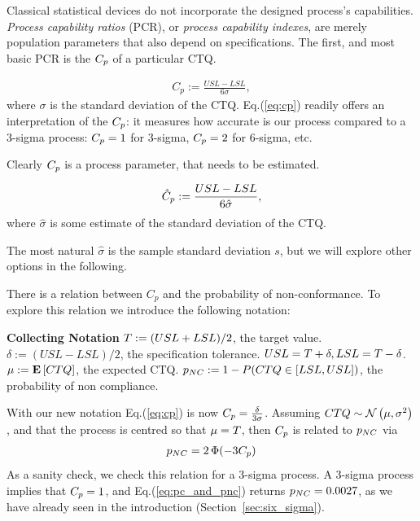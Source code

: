 Classical statistical devices do not incorporate the designed process's capabilities.
\emph{Process capability ratios} (PCR), or \emph{process capability indexes}, are merely population parameters that also depend on specifications.
The first, and most basic PCR is the $\cp$ of a particular CTQ.

\begin{definition}[$\cp$]
\begin{align}
\label{eq:cp}
	C_p:= \frac{USL-LSL}{6 \sigma}, 
\end{align}
where $\sigma$ is the standard deviation of the CTQ.
Eq.(\ref{eq:cp}) readily offers an interpretation of the $\cp$: it measures how accurate is our process compared to a 3-sigma process: $C_p=1$ for 3-sigma, $C_p=2$ for 6-sigma, etc.

\end{definition}
Clearly $\cp$ is a process parameter, that needs to be estimated.
\begin{definition}[$\cpHat$]
\begin{align}
	\hat{C}_p:= \frac{USL-LSL}{6 \hat{\sigma}}, 
\end{align}
where $\hat{\sigma}$ is some estimate of the standard deviation of the CTQ.
\end{definition}
The most natural $\hat{\sigma}$ is the sample standard deviation $s$, but we will explore other options in the following.


There is a relation between $C_p$ and the probability of non-conformance. 
To explore this relation we introduce the following notation:
\begin{tcolorbox}
\footnotesize
\textbf{Collecting Notation} \newline
$T:= (USL+LSL)/2$, the target value. \newline
$\delta:= (USL-LSL)/2$, the specification tolerance. $USL=T+\delta, LSL=T-\delta$.  \newline
$\mu:= \mathbf{E}\left[ CTQ \right]$, the expected CTQ. \newline
$p_{NC}:= 1-P(CTQ \in [LSL,USL])$, the probability of non compliance. 
\end{tcolorbox}

With our new notation Eq.(\ref{eq:cp}) is now $C_p=\frac{\delta}{3 \sigma}$.
Assuming $CTQ \sim \mathcal{N}\left(\mu, \sigma^2\right)$, and that the process is centred so that $\mu=T$, then $\cp$ is related to $p_{NC}$ via
\begin{align}
\label{eq:pc_and_pnc}
	p_{NC}= 2\, \Phi(-3 C_p)
\end{align}
As a sanity check, we check this relation for a 3-sigma process.
A 3-sigma process implies that $C_p=1$, and Eq.(\ref{eq:pc_and_pnc}) returns $p_{NC}=0.0027$, as we have already seen in the introduction (Section~\ref{sec:six_sigma}).

